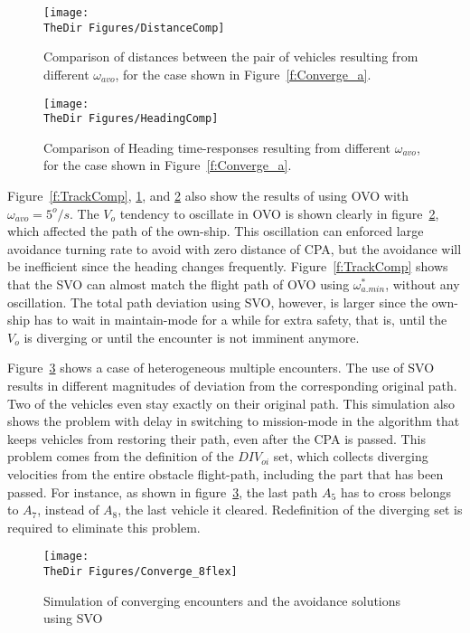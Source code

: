 \begin{figure}[h!]
	\texttt{[image: \\TheDir Figures/DistanceComp]}
	\centering
	\caption{Comparison of distances between the pair of vehicles resulting from different $\omega_{avo}$, for the case shown in Figure~\ref{f:Converge_a}.}
	\label{f:DistanceComp}
\end{figure} 

\begin{figure}[h!]
	\texttt{[image: \\TheDir Figures/HeadingComp]}
	\centering
	\caption{Comparison of Heading time-responses resulting from different $\omega_{avo}$, for the case shown in Figure~\ref{f:Converge_a}.}
	\label{f:HeadingComp}
\end{figure}

Figure~\ref{f:TrackComp}, \ref{f:DistanceComp}, and \ref{f:HeadingComp} also show the results of using OVO with $\omega_{avo} = 5^o/s$. The $V_o$ tendency to oscillate in OVO is shown clearly in figure~\ref{f:HeadingComp}, which affected the path of the own-ship. This oscillation can enforced large avoidance turning rate to avoid with zero distance of CPA, but the avoidance will be inefficient since the heading changes frequently. Figure~\ref{f:TrackComp} shows that the SVO can almost match the flight path of OVO using $\omega_{a.min}^*$, without any oscillation. The total path deviation using SVO, however, is larger since the own-ship has to wait in maintain-mode for a while for extra safety, that is, until the $V_o$ is diverging or until the encounter is not imminent anymore.  

Figure~\ref{f:Converge_b} shows a case of heterogeneous multiple encounters. The use of SVO results in different magnitudes of deviation from the corresponding original path. Two of the vehicles even stay exactly on their original path. This simulation also shows the problem with delay in switching to mission-mode in the algorithm that keeps vehicles from restoring their path, even after the CPA is passed. This problem comes from the definition of the $DIV_{oi}$ set, which collects diverging velocities from the entire obstacle flight-path, including the part that has been passed. For instance, as shown in figure~\ref{f:Converge_b}, the last path $A_5$ has to cross belongs to $A_7$, instead of $A_8$, the last vehicle it cleared. Redefinition of the diverging set is required to eliminate this problem. 

\begin{figure}[h!]
	\centering
	\texttt{[image: \\TheDir Figures/Converge\_8flex]}
	\caption{Simulation of converging encounters and the avoidance solutions using SVO}
	\label{f:Converge_b}
\end{figure}


